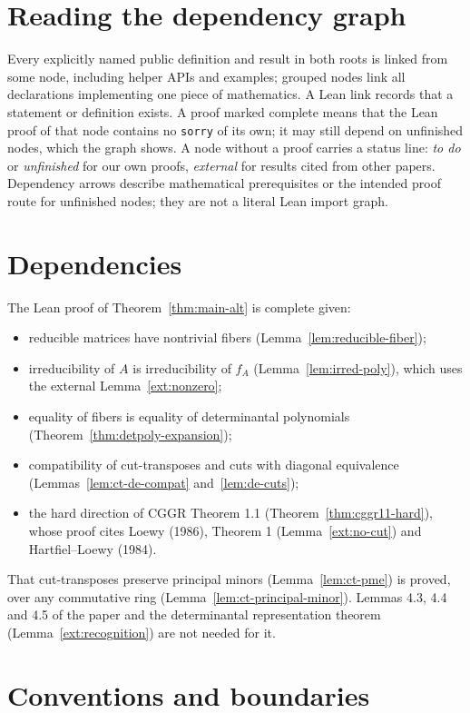 \section{Reading the dependency graph}

Every explicitly named public definition and result in both roots is linked from some
node, including helper APIs and examples; grouped nodes link all declarations implementing
one piece of mathematics. A Lean link records that a statement or definition exists.
A proof marked complete means that the Lean proof of that node contains no \texttt{sorry}
of its own; it may still depend on unfinished nodes, which the graph shows.
A node without a proof carries a status line: \emph{to do} or \emph{unfinished} for our own
proofs, \emph{external} for results cited from other papers. Dependency arrows describe
mathematical prerequisites or the intended proof route for unfinished nodes; they are not
a literal Lean import graph.

\section{Dependencies}

The Lean proof of Theorem~\ref{thm:main-alt} is complete given:
\begin{itemize}
\item reducible matrices have nontrivial fibers (Lemma~\ref{lem:reducible-fiber});
\item irreducibility of $A$ is irreducibility of $f_A$ (Lemma~\ref{lem:irred-poly}), which
uses the external Lemma~\ref{ext:nonzero};
\item equality of fibers is equality of determinantal polynomials
(Theorem~\ref{thm:detpoly-expansion});
\item compatibility of cut-transposes and cuts with diagonal equivalence
(Lemmas~\ref{lem:ct-de-compat} and~\ref{lem:de-cuts});
\item the hard direction of CGGR Theorem 1.1 (Theorem~\ref{thm:cggr11-hard}), whose proof
cites Loewy (1986), Theorem 1 (Lemma~\ref{ext:no-cut}) and Hartfiel--Loewy (1984).
\end{itemize}
That cut-transposes preserve principal minors (Lemma~\ref{lem:ct-pme}) is proved, over any
commutative ring (Lemma~\ref{lem:ct-principal-minor}).
Lemmas 4.3, 4.4 and 4.5 of the paper and the determinantal representation theorem
(Lemma~\ref{ext:recognition}) are not needed for it.

\section{Conventions and boundaries}

